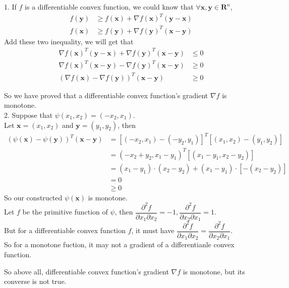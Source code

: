 \documentclass[10pt]{article}
\renewcommand{\mathbf}{\boldsymbol}
\begin{document}
\begin{enumerate}
1. If $f$ is a differentiable convex function, we could know that $\forall\mathbf{x},\mathbf{y}\in\mathbf{R}^n$,
\begin{align*}
    f(\mathbf{y}) &\geq f(\mathbf{x})+\nabla f(\mathbf{x})^T(\mathbf{y}-\mathbf{x})\\
    f(\mathbf{x}) &\geq f(\mathbf{y})+\nabla f(\mathbf{y})^T(\mathbf{x}-\mathbf{y})
\end{align*}
Add these two inequality, we will get that
\begin{align*}
    \nabla f(\mathbf{x})^T(\mathbf{y}-\mathbf{x})+\nabla f(\mathbf{y})^T(\mathbf{x}-\mathbf{y}) &\leq 0\\
    \nabla f(\mathbf{x})^T(\mathbf{x}-\mathbf{y})-\nabla f(\mathbf{y})^T(\mathbf{x}-\mathbf{y}) &\geq 0\\
    (\nabla f(\mathbf{x})-\nabla f(\mathbf{y}))^T(\mathbf{x}-\mathbf{y}) &\geq 0
\end{align*}

So we have proved that a differentiable convex function's gradient $\nabla f$ is monotone.\\

2. Suppose that $\psi(x_1,x_2)=(-x_2,x_1)$.\\
Let $\mathbf{x}=(x_1,x_2)$ and $\mathbf{y}=(y_1,y_2)$, then
\begin{align*}
    (\psi(\mathbf{x})-\psi(\mathbf{y}))^T(\mathbf{x}-\mathbf{y}) &= [(-x_2,x_1)-(-y_2,y_1)]^T[(x_1,x_2)-(y_1,y_2)]\\
    &= (-x_2+y_2,x_1-y_1)^T[(x_1-y_1,x_2-y_2)]\\
    &= (x_1-y_1)\cdot (x_2-y_2) + (x_1-y_1)\cdot [-(x_2-y_2)]\\
    &= 0\\
    &\geq 0
\end{align*}
So our constructed $\psi(\mathbf{x})$ is monotone.\\
Let $f$ be the primitive function of $\psi$, then $\dfrac{\partial^2f}{\partial x_1\partial x_2}=-1, \dfrac{\partial^2f}{\partial x_2\partial x_1}=1$.\\

But for a differentiable convex function $f$, it must have $\dfrac{\partial^2 f}{\partial x_1\partial x_2}=\dfrac{\partial^2 f}{\partial x_2\partial x_1}$.\\

So for a monotone fuction, it may not a gradient of a differentianle convex function.

So above all, differentiable convex function's gradient $\nabla f$ is monotone, but its converse is not true.\\


\end{enumerate}
\end{document}
